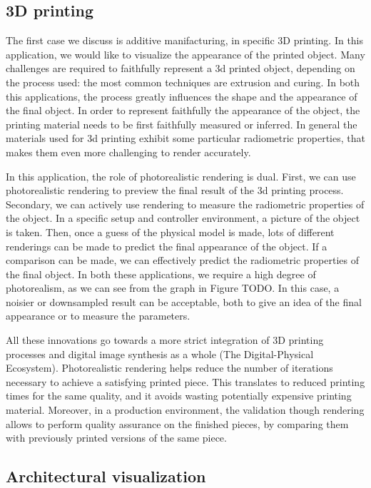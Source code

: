 \subsection{3D printing}
The first case we discuss is additive manifacturing, in specific 3D printing. In this application, we would like to visualize the appearance of the printed object. Many challenges are required to faithfully represent a 3d printed object, depending on the process used: the most common techniques are extrusion and curing. In both this applications, the process greatly influences the shape and the appearance of the final object. In order to represent faithfully the appearance of the object, the printing material needs to be first faithfully measured or inferred. In general the materials used for 3d printing exhibit some particular radiometric properties, that makes them even more challenging to render accurately. 

In this application, the role of photorealistic rendering is dual. First, we can use photorealistic rendering to preview the final result of the 3d printing process. Secondary, we can actively use rendering to measure the radiometric properties of the object. In a specific setup and controller environment, a picture of the object is taken. Then, once a guess of the physical model is made, lots of different renderings can be made to predict the final appearance of the object. If a comparison can be made, we can effectively predict the radiometric properties of the final object. In both these applications, we require a high degree of photorealism, as we can see from the graph in Figure TODO. In this case, a noisier or downsampled result can be acceptable, both to give an idea of the final appearance or to measure the parameters. 

All these innovations go towards a more strict integration of 3D printing processes and digital image synthesis as a whole (The Digital-Physical Ecosystem). Photorealistic rendering helps reduce the number of iterations necessary to achieve a satisfying printed piece. This translates to reduced printing times for the same quality, and it avoids wasting potentially expensive printing material. Moreover, in a production environment, the validation though rendering allows to perform quality assurance on the finished pieces, by comparing them with previously printed versions of the same piece.

\subsection{Architectural visualization}


